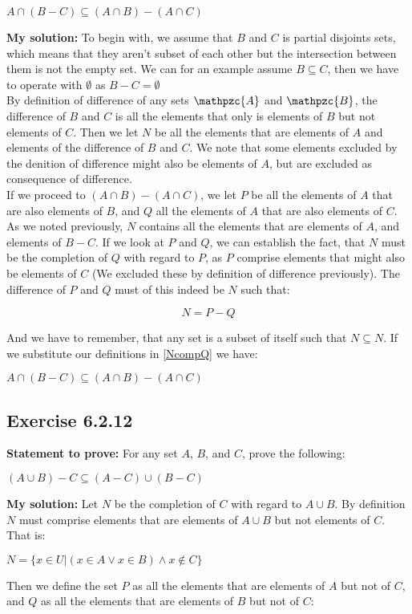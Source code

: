 \documentclass{report}
\newcommand{\cent}[1]{\begin{center}#1\end{center}}
\newcommand{\mat}[2]{\begin{equation} \label{#2}#1\end{equation}}
\newcommand{\In}{\! \in \!}
\newcommand{\script}[1]{\mathpzc{#1}}
\newcommand{\Prove}{\textbf{Statement to prove: }}
\newcommand{\solution}{\textbf{My solution: }}
\newcommand{\QED}{\boxed{}}
\newcommand{\Exercise}[1]{\subsection{Exercise #1}}
\begin{document}
	\cent{$ A \cap (B-C) \subseteq (A \cap B) - (A \cap C) $}
	
	\solution
	To begin with, we assume that $B$ and $C$ is partial disjoints sets, which means that they aren't subset of each other but the intersection between them is not the empty set. We can for an example assume $B \subseteq C$, then we have to operate with $\emptyset$ as $B - C = \emptyset$\\
	
	By definition of difference of any sets $\script{A}$ and $ \script{B} $, the difference of $B$ and $C$ is all the elements that only is elements of $B$ but not elements of $C$. Then we let $N$ be all the elements that are elements of $A$ and elements of the difference of $B$ and $C$. We note that some elements excluded by the denition of difference might also be elements of $A$, but are excluded as consequence of difference.\\
	
	If we proceed to $(A \cap B) - (A \cap C)$, we let $P$ be all the elements of $A$ that are also elements of $B$, and $Q$ all the elements of $A$ that are also elements of $C$. As we noted previously, $N$ contains all the elements that are elements of $A$, and elements of $B -C$. If we look at $P$ and $Q$, we can establish the fact, that $N$ must be the completion of $Q$ with regard to $P$, as $P$ comprise elements that might also be elements of $C$ (We excluded these by definition of difference previously). The difference of $P$ and $Q$ must of this indeed be $N$ such that:
	
	\mat{N = P-Q}{NcompQ}
	
	And we have to remember, that any set is a subset of itself such that  $N \subseteq N$. If we substitute our definitions in \eqref{NcompQ} we have:
	\cent{$ A \cap (B-C) \subseteq (A \cap B) - (A \cap C) $}
	
	\QED
	
	\Exercise{6.2.12}
	
	\Prove
	For any set $A$, $B$, and $C$, prove the following:
	
	\cent{$(A \cup B) - C \subseteq (A-C) \cup (B-C)$}
	
	\solution
	Let $N$ be the completion of $C$ with regard  to $A\cup B$. By definition $N$ must comprise elements that are elements of $A \cup B$ but not elements of $C$. That is:
	
	\cent{$ N = \{x \In U | (x \In A \vee x \In B) \wedge x \notin C\} $}
	
	Then we define the set $P$ as all the elements that are elements of $A$ but not of $C$, and $Q$ as all the elements that are elements of $B$ but not of $C$:
	
\end{document}
